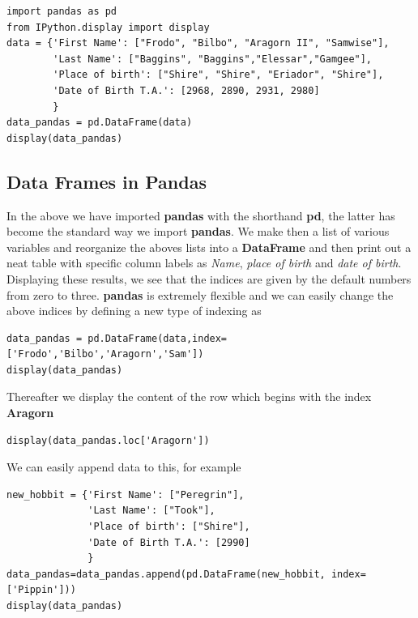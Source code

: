 \documentclass[%
oneside,                 %
final,                   %
10pt]{article}
\begin{document}
\begin{verbatim}
import pandas as pd
from IPython.display import display
data = {'First Name': ["Frodo", "Bilbo", "Aragorn II", "Samwise"],
        'Last Name': ["Baggins", "Baggins","Elessar","Gamgee"],
        'Place of birth': ["Shire", "Shire", "Eriador", "Shire"],
        'Date of Birth T.A.': [2968, 2890, 2931, 2980]
        }
data_pandas = pd.DataFrame(data)
display(data_pandas)
\end{verbatim}


\subsection*{Data Frames in Pandas}

In the above we have imported \textbf{pandas} with the shorthand \textbf{pd}, the latter has become the standard way we import \textbf{pandas}. We make then a list of various variables
and reorganize the aboves lists into a \textbf{DataFrame} and then print out  a neat table with specific column labels as \emph{Name}, \emph{place of birth} and \emph{date of birth}.
Displaying these results, we see that the indices are given by the default numbers from zero to three.
\textbf{pandas} is extremely flexible and we can easily change the above indices by defining a new type of indexing as
\begin{verbatim}
data_pandas = pd.DataFrame(data,index=['Frodo','Bilbo','Aragorn','Sam'])
display(data_pandas)
\end{verbatim}
Thereafter we display the content of the row which begins with the index \textbf{Aragorn}
\begin{verbatim}
display(data_pandas.loc['Aragorn'])
\end{verbatim}

We can easily append data to this, for example
\begin{verbatim}
new_hobbit = {'First Name': ["Peregrin"],
              'Last Name': ["Took"],
              'Place of birth': ["Shire"],
              'Date of Birth T.A.': [2990]
              }
data_pandas=data_pandas.append(pd.DataFrame(new_hobbit, index=['Pippin']))
display(data_pandas)
\end{verbatim}
\end{document}

